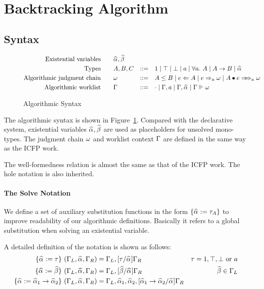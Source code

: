 
\section{Backtracking Algorithm}

\subsection{Syntax}

\begin{figure}[ht]
    \begin{gather*}
    \begin{aligned}
        \text{Existential variables}\qquad&\al, \bt\\
        \text{Types}\qquad&A, B, C &::=&\quad 1 \mid \top \mid \bot \mid a \mid \all A \mid A\to B \mid \al\\
        \text{Algorithmic judgment chain}\qquad&\jg &::=&\quad A \le B \mid e\Lto A \mid e\To_{a} \jg \mid \appInfAlg{A}{e}\\
        \text{Algorithmic worklist}\qquad&\Gm &::=&\quad \cdot \mid \Gm, a \mid \Gm, \al \mid \Gm \Vdash \jg
    \end{aligned}
    \end{gather*}
\caption{Algorithmic Syntax}\label{fig:top_alg_syntax}
\end{figure}

The algorithmic syntax is shown in Figure~\ref{fig:top_alg_syntax}.
Compared with the declarative system, existential variables $\al, \bt$ are used
as placeholders for unsolved mono-types.
The judgment chain $\omega$ and worklist context $\Gamma$ are defined in the same way as the ICFP work.

The well-formedness relation is almost the same as that of the ICFP work.
The hole notation is also inherited.

\paragraph{The Solve Notation}
We define a set of auxiliary substitution functions in the form $\{\al := \tau_A\}$
to improve readability of our algorithmic definitions.
Basically it refers to a global substitution when solving an existential variable.

A detailed definition of the notation is shown as follows:
\begin{gather*}
    \begin{aligned}
        \{\al := \tau\}~(\Gm_L, \al, \Gm_R) &= \Gm_L, [\tau/\al]\Gm_R & \tau = 1, \top, \bot \text{ or }a\\
        \{\al := \bt\}~(\Gm_L, \al, \Gm_R) &= \Gm_L, [\bt/\al]\Gm_R & \bt \in \Gm_L\\
        \{\al := \al[1] \to \al[2]\}~(\Gm_L, \al, \Gm_R) &= \Gm_L, \al[1], \al[2], [\al[1] \to \al[2]/\al]\Gm_R\\
    \end{aligned}
\end{gather*}

